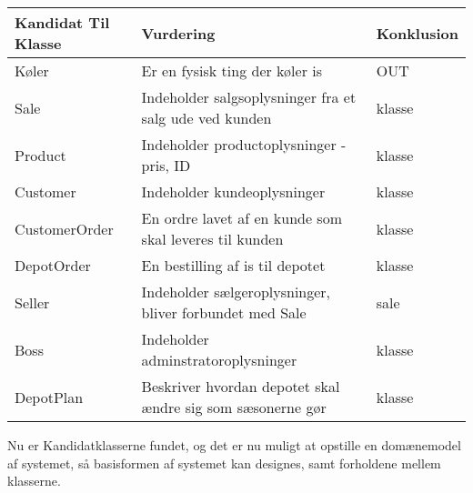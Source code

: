 \begin{longtable}{|p{120pt}|p{120pt}|p{120pt}|}\label{fig:Kandidatklasser}
    \textbf{Kandidat Til Klasse} & \textbf{Vurdering} & \textbf{Konklusion} \\
    \hline
    \hline
    Køler & Er en fysisk ting der køler is & OUT \\
    \hline
    Sale & Indeholder salgsoplysninger fra et salg ude ved kunden & klasse \\
    \hline
    Product & Indeholder productoplysninger - pris, ID & klasse \\
    \hline
    Customer & Indeholder kundeoplysninger & klasse \\
    \hline
    CustomerOrder & En ordre lavet af en kunde som skal leveres til kunden & klasse \\
    \hline
    DepotOrder & En bestilling af is til depotet & klasse \\
    \hline
    Seller & Indeholder sælgeroplysninger, bliver forbundet med Sale & sale \\
    \hline
    Boss & Indeholder adminstratoroplysninger & klasse \\
    \hline
    DepotPlan & Beskriver hvordan depotet skal ændre sig som sæsonerne gør & klasse \\
    \hline
\end{longtable}
Nu er Kandidatklasserne fundet, og det er nu muligt at opstille en domænemodel af systemet, så basisformen af systemet kan designes, samt forholdene mellem klasserne.

